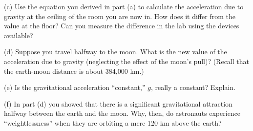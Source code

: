 (c) Use the equation you derived in part (a) to calculate the acceleration due
to gravity at the ceiling of the room you are now in. How does it differ from
the value at the floor? Can you measure the difference in the lab using the
devices available?
\vspace{30mm}

(d) Suppose you travel \underline{halfway} to the moon. What is the new value of the acceleration due to gravity (neglecting the effect of the moon's pull)? (Recall that the earth-moon distance is about 384,000 km.)
\vspace{30mm}

(e) Is the gravitational acceleration ``constant,'' $g$, really 
a constant? Explain.
\vspace{30mm}

(f) In part (d) you showed that there is a significant gravitational attraction
halfway between the earth and the moon. Why, then, do astronauts experience
``weightlessness'' when they are orbiting a mere 120 km above the earth?

